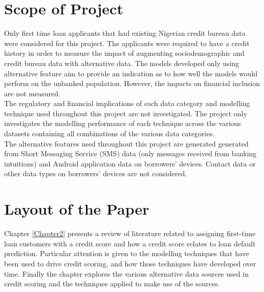 
\section{Scope of Project}

Only first time loan applicants that had existing Nigerian credit bureau data were considered for this project. The applicants were required to have a credit history in order to measure the impact of augmenting sociodemographic and credit bureau data with alternative data. The models developed only using alternative feature aim to provide an indication as to how well the models would perform on the unbanked population. However, the impacts on financial inclusion are not measured. \\

The regulatory and financial implications of each data category and modelling technique used throughout this project are not investigated. The project only investigates the modelling performance of each technique across the various datasets containing all combinations of the various data categories. \\

The alternative features used throughout this project are generated generated from Short Messaging Service (SMS) data (only messages received from banking intuitions) and Android application data on borrowers' devices. Contact data or other data types on borrowers' devices are not considered. \\


\section{Layout of the Paper}

Chapter \ref{Chapter2} presents a review of literature related to assigning first-time loan customers with a credit score and how a credit score relates to loan default prediction. Particular attention is given to the modelling techniques that have been used to drive credit scoring, and how those techniques have developed over time. Finally the chapter explores the various alternative data sources used in credit scoring and the techniques applied to make use of the sources. \\


